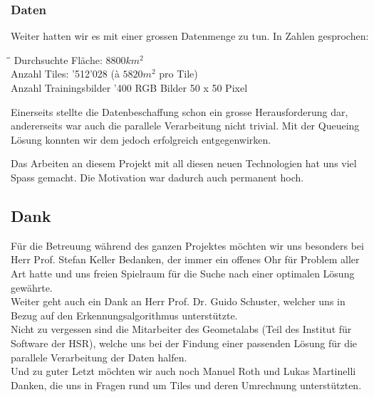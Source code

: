 \subsubsection{Daten}
Weiter hatten wir es mit einer grossen Datenmenge zu tun. In Zahlen gesprochen:
\begin{tabbing}
    \hspace*{8cm}\=\hspace*{4cm}\= \kill
    Durchsuchte Fläche: \> $8800 km^{2}$  \\
    Anzahl Tiles: '512'028 (à $5820 m^{2}$ pro Tile)\\
    Anzahl Trainingsbilder '400 RGB Bilder 50 x 50 Pixel \\
\end{tabbing}
Einerseits stellte die Datenbeschaffung schon ein grosse Herausforderung dar, andererseits war auch die parallele Verarbeitung nicht trivial. Mit der Queueing Lösung konnten wir dem jedoch erfolgreich entgegenwirken.

Das Arbeiten an diesem Projekt mit all diesen neuen Technologien hat uns viel Spass gemacht. Die Motivation war dadurch auch permanent hoch.
\newpage
\subsection{Dank}
Für die Betreuung während des ganzen Projektes möchten wir uns besonders bei Herr Prof. Stefan Keller Bedanken, der immer ein offenes Ohr für Problem aller Art hatte und uns freien Spielraum für die Suche nach einer optimalen Lösung gewährte. \\
Weiter geht auch ein Dank an Herr Prof. Dr.  Guido Schuster, welcher uns in Bezug auf den Erkennungsalgorithmus unterstützte. \\
Nicht zu vergessen sind die Mitarbeiter des Geometalabs (Teil des Institut für Software der HSR), welche uns bei der Findung einer passenden Lösung für die parallele Verarbeitung der Daten halfen.\\
Und zu guter Letzt möchten wir auch noch Manuel Roth und Lukas Martinelli Danken, die uns in Fragen rund um Tiles und deren Umrechnung unterstützten.
	
